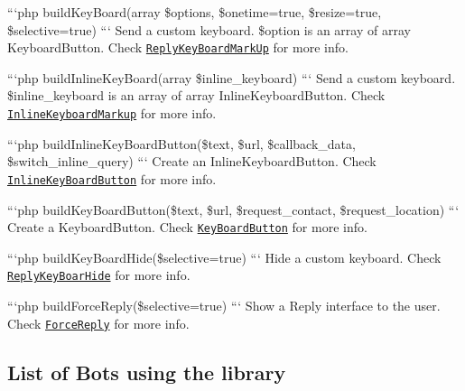 ```php build\-Key\-Board(array \$options, \$onetime=true, \$resize=true, \$selective=true) ``` Send a custom keyboard. \$option is an array of array Keyboard\-Button. Check \href{https://core.telegram.org/bots/api#replykeyboardmarkup}{\tt Reply\-Key\-Board\-Mark\-Up} for more info.

```php build\-Inline\-Key\-Board(array \$inline\-\_\-keyboard) ``` Send a custom keyboard. \$inline\-\_\-keyboard is an array of array Inline\-Keyboard\-Button. Check \href{https://core.telegram.org/bots/api#inlinekeyboardmarkup}{\tt Inline\-Keyboard\-Markup} for more info.

```php build\-Inline\-Key\-Board\-Button(\$text, \$url, \$callback\-\_\-data, \$switch\-\_\-inline\-\_\-query) ``` Create an Inline\-Keyboard\-Button. Check \href{https://core.telegram.org/bots/api#inlinekeyboardbutton}{\tt Inline\-Key\-Board\-Button} for more info.

```php build\-Key\-Board\-Button(\$text, \$url, \$request\-\_\-contact, \$request\-\_\-location) ``` Create a Keyboard\-Button. Check \href{https://core.telegram.org/bots/api#keyboardbutton}{\tt Key\-Board\-Button} for more info.

```php build\-Key\-Board\-Hide(\$selective=true) ``` Hide a custom keyboard. Check \href{https://core.telegram.org/bots/api#replykeyboardhide}{\tt Reply\-Key\-Boar\-Hide} for more info.

```php build\-Force\-Reply(\$selective=true) ``` Show a Reply interface to the user. Check \href{https://core.telegram.org/bots/api#forcereply}{\tt Force\-Reply} for more info.

\subsection*{List of Bots using the library }

